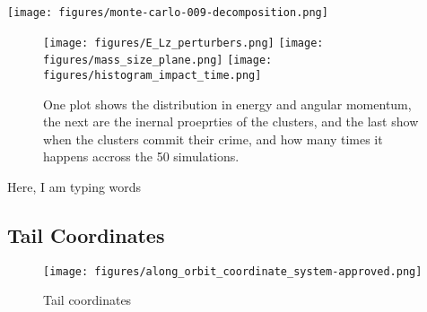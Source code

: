 \documentclass[draft]{aa}
\begin{document}
  \begin{figure*}
    \centering
    \texttt{[image: figures/monte-carlo-009-decomposition.png]}
    \caption[]{This figure decomposes the gaps found in the full simulation to the responsible perturbers. The pertuber candidates were found in Fig.~\ref{fig:profiles}, and extra simulations were run in which we singularly add the suspects to verify that it was indeed them who created the gaps. The titles explain which simulation is which, and there's also a descrepandy map. (I think I'm going to get rid of the DIFF map)}
    \label{fig:profiles}
    \end{figure*}  


  




  \begin{figure}
    \centering
    \texttt{[image: figures/E\_Lz\_perturbers.png]}
    \texttt{[image: figures/mass\_size\_plane.png]}
    \texttt{[image: figures/histogram\_impact\_time.png]}
    \caption{One plot shows the distribution in energy and angular momentum, the next are the inernal proeprties of the clusters, and the last show when the clusters commit their crime, and how many times it happens accross the 50 simulations. }
    \label{fig:mass_size_plane}
    \end{figure}



  Here, I am typing words





\begin{appendix}

  \section{Tail Coordinates} \label{appendix:TailCoordinates}

  \begin{figure}
    \centering
    \texttt{[image: figures/along\_orbit\_coordinate\_system-approved.png]}
    \caption{Tail coordinates}
    \label{fig:TailCoordinates}
  \end{figure}



\end{appendix}
\end{document}
